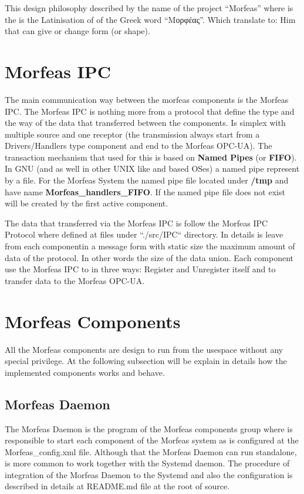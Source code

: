 \documentclass{article}
\begin{document}
This design philosophy described by the name of the project ``Morfeas'' where is the is the Latinisation of of the Greek word
``Μορφέας''. Which translate to: Him that can give or change form (or shape).

\section{Morfeas IPC}
The main communication way between the morfeas components is the Morfeas IPC. The Morfeas IPC is nothing more from a protocol that define the type and
the way of the data that transferred between the components. Is simplex with multiple source and one receptor (the transmission always start from a
Drivers/Handlers type component and end to the Morfeas OPC-UA).
The transaction mechanism that used for this is based on \textbf{Named Pipes} (or \textbf{FIFO}). In GNU (and as well in other UNIX like and based OSes) a named pipe represent by a file.
For the Morfeas System the named pipe file located under \textbf{/tmp} and have name \textbf{Morfeas\_handlers\_FIFO}.
If the named pipe file does not exist will be created by the first active component.

The data that transferred via the Morfeas IPC is follow the Morfeas IPC Protocol where defined at files under ``./src/IPC`` directory.
In details is leave from each componentin a message form with static size the maximum amount of data of the protocol. In other words the size of the data union.
Each component use the Morfeas IPC to in three ways: Register and Unregister itself and to transfer data to the Morfeas OPC-UA.
\section{Morfeas Components}
All the Morfeas components are design to run from the usespace without any special privilege.
At the following subsection will be explain in details how the implemented components works and behave.

\subsection{Morfeas Daemon}
The Morfeas Daemon is the program of the Morfeas components group where is responsible to start each component of the Morfeas system as is configured
at the Morfeas\_config.xml file. Although that the Morfeas Daemon can run standalone, is more common to work together with the Systemd daemon.
The procedure of integration of the Morfeas Daemon to the Systemd and also the configuration is described in details at README.md file at the root of source.
\end{document}
